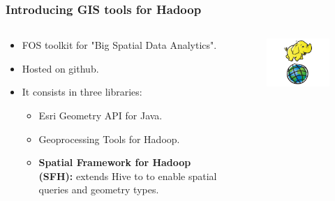 \documentclass[hyperref={pdfpagelabels=true}]{beamer}
\begin{document}
\begin{frame}
\frametitle{Introducing GIS tools for Hadoop}
\begin{columns}
  \begin{column}{0.5\textwidth}
   \begin{itemize}  
    \item<2->FOS toolkit for "Big Spatial Data Analytics".%
    \item<2->Hosted on github.
    \item<2->It consists in three libraries:
   \begin{itemize}    
      \item<2->Esri Geometry API for Java.
      \item<2->Geoprocessing Tools for Hadoop.
      \item<2->\textbf{Spatial Framework for Hadoop (SFH):} extends Hive to to enable spatial queries and geometry types.%
    \end{itemize} 
   \end{itemize}     
 \end{column}  
  \begin{column}{0.5\textwidth}
    \begin{figure}       
	\includegraphics[width=\textwidth]{gis4hadoop.png}      
     \end{figure}        
 \end{column}  
 \end{columns}  
\end{frame}
\end{document}
